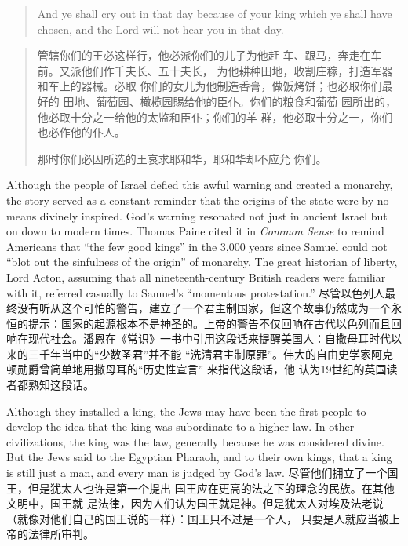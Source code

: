 \begin{paracol}{2}
\begin{quotation}
	And ye shall cry out in that day because of your king which ye
	shall have chosen, and the Lord will not hear you in that day.
\end{quotation}
\switchcolumn
\begin{quotation}
	管辖你们的王必这样行，他必派你们的儿子为他赶
	车、跟马，奔走在车前。又派他们作千夫长、五十夫长，
	为他耕种田地，收割庄稼，打造军器和车上的器械。必取
	你们的女儿为他制造香膏，做饭烤饼；也必取你们最好的
	田地、葡萄园、橄榄园賜给他的臣仆。你们的粮食和葡萄
	园所出的，他必取十分之一给他的太监和臣仆；你们的羊
	群，他必取十分之一，你们也必作他的仆人。
	
	那时你们必因所选的王哀求耶和华，耶和华却不应允
	你们。
\end{quotation}
\switchcolumn*
Although the people of Israel defied this awful warning and
created a monarchy, the story served as a constant reminder
that the origins of the state were by no means divinely inspired.
God's warning resonated not just in ancient Israel but on down
to modern times. Thomas Paine cited it in \textit{Common Sense} to remind Americans that ``the few good kings'' in the 3,000 years since Samuel could not ``blot out the sinfulness of the origin'' of
monarchy. The great historian of liberty, Lord Acton, assuming that all nineteenth-century British readers were familiar with it, referred casually to Samuel's ``momentous protestation.''
\switchcolumn
尽管以色列人最终没有听从这个可怕的警告，建立了一个君主制国家，但这个故事仍然成为一个永恒的提示：国家的起源根本不是神圣的。上帝的警告不仅回响在古代以色列而且回响在现代社会。潘恩在《常识》一书中引用这段话来提醒美国人：自撒母耳时代以来的三千年当中的“少数圣君”并不能 “洗清君主制原罪”。伟大的自由史学家阿克顿勋爵曾简单地用撒母耳的“历史性宣言” 来指代这段话，他 认为19世纪的英国读者都熟知这段话。

\switchcolumn*
Although they installed a king, the Jews may have been the
first people to develop the idea that the king was subordinate to
a higher law. In other civilizations, the king was the law, generally because he was considered divine. But the Jews said to the
Egyptian Pharaoh, and to their own kings, that a king is still
just a man, and every man is judged by God's law.
\switchcolumn
尽管他们拥立了一个国王，但是犹太人也许是第一个提出
国王应在更高的法之下的理念的民族。在其他文明中，国王就
是法律，因为人们认为国王就是神。但是犹太人对埃及法老说
（就像对他们自己的国王说的一样）：国王只不过是一个人，
只要是人就应当被上帝的法律所审判。


\end{paracol}
